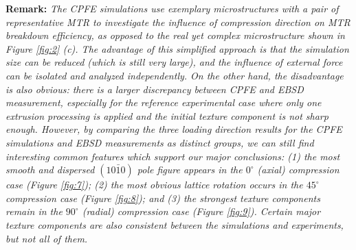 \documentclass[review]{elsarticle}
\begin{document}
        
		\textbf{Remark: } \textit{
		The CPFE simulations use exemplary microstructures with a pair of representative MTR to investigate the influence of compression direction on MTR breakdown efficiency, as opposed to the real yet complex microstructure shown in Figure \ref{fig:2} (c).
		The advantage of this simplified approach is that the simulation size can be reduced (which is still very large), and the influence of external force can be isolated and analyzed independently.
		On the other hand, the disadvantage is also obvious: there is a larger discrepancy between CPFE and EBSD measurement, especially for the reference experimental case where only one extrusion processing is applied and the initial texture component is not sharp enough.
		However, by comparing the three loading direction results for the CPFE simulations and EBSD measurements as distinct groups, we can still find interesting common features which support our major conclusions:
		(1) the most smooth and dispersed $(10\bar{1}0)$ pole figure appears in the $0^{\circ}$ (axial) compression case (Figure \ref{fig:7});
            (2) the most obvious lattice rotation occurs in the $45^{\circ}$ compression case (Figure \ref{fig:8}); and
            (3) the strongest texture components remain in the $90^{\circ}$ (radial) compression case (Figure \ref{fig:9}).
            Certain major texture components are also consistent between the simulations and experiments, but not all of them.}
            
\end{document}
